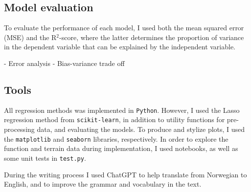 \subsection{Model evaluation}\label{ssec:evaluation}
To evaluate the performance of each model, I used both the mean squared error (MSE) and the R$^{2}$-score, where the latter determines the proportion of variance in the dependent variable that can be explained by the independent variable.

- Error analysis
- Bias-variance trade off

\subsection{Tools}\label{ssec:tools}
All regression methods was implemented in \verb|Python|. However, I used the Lasso regression method from \verb|scikit-learn|, in addition to utility functions for pre-processing data, and evaluating the models. To produce and stylize plots, I used the \verb|matplotlib| and \verb|seaborn| libraries, respectively. In order to explore the function and terrain data during implementation, I used notebooks, as well as some unit tests in \verb|test.py|. 

During the writing process I used ChatGPT to help translate from Norwegian to English, and to improve the grammar and vocabulary in the text.